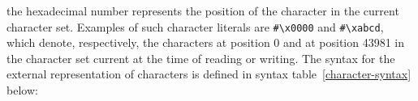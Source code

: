 \begin{optDefinition}
the hexadecimal number represents the position of the character in the current
character set.  Examples of such character literals are \verb+#\x0000+ and
\verb+#\xabcd+, which denote, respectively, the characters at position 0 and at
position 43981 in the character set current at the time of reading or writing.
The syntax for the external representation of characters is defined in syntax
table~\ref{character-syntax} below:
%
\Syntax
\label{character-syntax}
%


\end{optDefinition}
